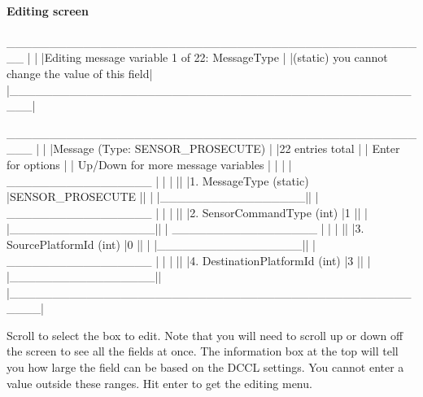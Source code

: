 \paragraph{Editing screen}
\begin{boxedverbatim}

    __________________________________________________
   |                                                  |
   |Editing message variable 1 of 22: MessageType     |
   |(static) you cannot change the value of this field|
   |__________________________________________________|

   ___________________________________________________
  |                                                   | 
  |Message (Type: SENSOR_PROSECUTE)                   |
  |22 entries total                                   |
  |        {Enter} for options                        |
  |        {Up/Down} for more message variables       |
  |                                                   |
  |                                 _________________ |
  |                                |                 ||
  |1. MessageType (static)         |SENSOR_PROSECUTE ||
  |                                |_________________||
  |                                 _________________ |
  |                                |                 ||
  |2. SensorCommandType (int)      |1                ||
  |                                |_________________||
  |                                 _________________ |
  |                                |                 || 
  |3. SourcePlatformId (int)       |0                ||
  |                                |_________________||
  |                                 _________________ |
  |                                |                 ||
  |4. DestinationPlatformId (int)  |3                ||
  |                                |_________________||
  |___________________________________________________|
\end{boxedverbatim}
\resetbvlinenumber

Scroll to select the box to edit. Note that you will need to scroll up or down off the screen to see all the fields at once. The information box at the top will tell you how large the field can be based on the DCCL settings. You cannot enter a value outside these ranges. Hit enter to get the editing menu.

